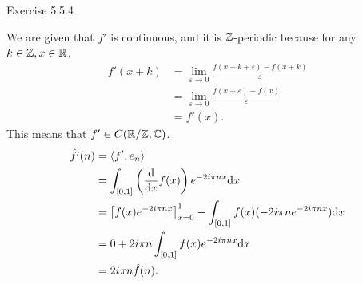 \documentclass{article}
\begin{document}
\bigskip
\begin{prob}
    Exercise 5.5.4
\end{prob}
We are given that $f'$ is continuous, and it is $\mathbb{Z}$-periodic because for any $k \in \mathbb{Z}, x \in \mathbb{R}$,
\begin{align*}
    f'(x+k) &= \lim_{\varepsilon \rightarrow 0} \frac{f(x+k+\varepsilon)-f(x+k)}{\varepsilon} \\
            &= \lim_{\varepsilon \rightarrow 0} \frac{f(x+\varepsilon)-f(x)}{\varepsilon} \\
            &= f'(x).
\end{align*}
This means that $f' \in C(\mathbb{R}/\mathbb{Z}, \mathbb{C})$.
\begin{align*}
    \hat{f'}(n) &= \left\langle f', e_n \right\rangle \\
                &= \int_{[0,1]} \left( \frac{\mathrm{d}}{\mathrm{d} x} f(x) \right) e^{-2i\pi n x} \mathrm{d} x \\
                &= \left[ f(x)e^{-2i \pi nx} \right]_{x=0}^1 - \int_{[0,1]} f(x) (-2i\pi n e^{-2i\pi n x}) \mathrm{d} x \\
                &= 0 + 2 i \pi n \int_{[0,1]} f(x) e^{-2i\pi n x} \mathrm{d} x \\
                &= 2i\pi n \hat{f}(n).
\end{align*}


\end{document}
